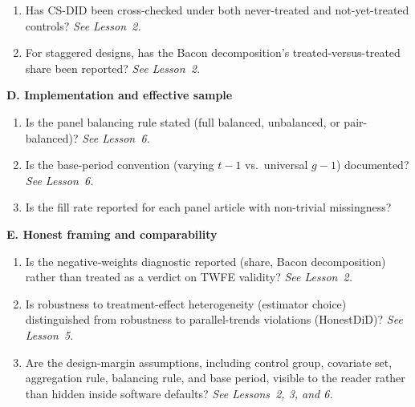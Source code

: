 \documentclass[11pt]{article}
\begin{document}
\begin{tcolorbox}
\begin{enumerate}[leftmargin=1.6em,itemsep=0.25em,label=\arabic*.,start=7]
\item Has CS-DID been cross-checked under both never-treated and not-yet-treated controls? \textit{See Lesson~2.}

\item For staggered designs, has the Bacon decomposition's treated-versus-treated share been reported? \textit{See Lesson~2.}
\end{enumerate}

\textbf{D. Implementation and effective sample}

\vspace{0.3em}
\begin{enumerate}[leftmargin=1.6em,itemsep=0.25em,label=\arabic*.,start=10]
\item Is the panel balancing rule stated (full balanced, unbalanced, or pair-balanced)? \textit{See Lesson~6.}

\item Is the base-period convention (varying $t-1$ vs.\ universal $g-1$) documented? \textit{See Lesson~6.}

\item Is the fill rate reported for each panel article with non-trivial missingness?
\end{enumerate}

\textbf{E. Honest framing and comparability}

\vspace{0.3em}
\begin{enumerate}[leftmargin=1.6em,itemsep=0.25em,label=\arabic*.,start=13]
\item Is the negative-weights diagnostic reported (share, Bacon decomposition) rather than treated as a verdict on TWFE validity? \textit{See Lesson~2.}

\item Is robustness to treatment-effect heterogeneity (estimator choice) distinguished from robustness to parallel-trends violations (HonestDiD)? \textit{See Lesson~5.}

\item Are the design-margin assumptions, including control group, covariate set, aggregation rule, balancing rule, and base period, visible to the reader rather than hidden inside software defaults? \textit{See Lessons~2, 3, and 6.}
\end{enumerate}
\end{tcolorbox}
\end{document}
